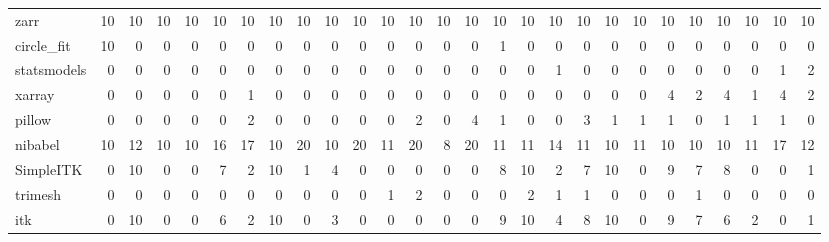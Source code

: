 \begin{tabular}{lrrrrrrrrrrrrrrrrrrrrrrrrrr}
zarr & 10 & 10 & 10 & 10 & 10 & 10 & 10 & 10 & 10 & 10 & 10 & 10 & 10 & 10 & 10 & 10 & 10 & 10 & 10 & 10 & 10 & 10 & 10 & 10 & 10 & 10 \\
circle\_fit & 10 & 0 & 0 & 0 & 0 & 0 & 0 & 0 & 0 & 0 & 0 & 0 & 0 & 0 & 1 & 0 & 0 & 0 & 0 & 0 & 0 & 0 & 0 & 0 & 0 & 0 \\
statsmodels & 0 & 0 & 0 & 0 & 0 & 0 & 0 & 0 & 0 & 0 & 0 & 0 & 0 & 0 & 0 & 0 & 1 & 0 & 0 & 0 & 0 & 0 & 0 & 0 & 1 & 2 \\
xarray & 0 & 0 & 0 & 0 & 0 & 1 & 0 & 0 & 0 & 0 & 0 & 0 & 0 & 0 & 0 & 0 & 0 & 0 & 0 & 0 & 4 & 2 & 4 & 1 & 4 & 2 \\
pillow & 0 & 0 & 0 & 0 & 0 & 2 & 0 & 0 & 0 & 0 & 0 & 2 & 0 & 4 & 1 & 0 & 0 & 3 & 1 & 1 & 1 & 0 & 1 & 1 & 1 & 0 \\
nibabel & 10 & 12 & 10 & 10 & 16 & 17 & 10 & 20 & 10 & 20 & 11 & 20 & 8 & 20 & 11 & 11 & 14 & 11 & 10 & 11 & 10 & 10 & 10 & 11 & 17 & 12 \\
SimpleITK & 0 & 10 & 0 & 0 & 7 & 2 & 10 & 1 & 4 & 0 & 0 & 0 & 0 & 0 & 8 & 10 & 2 & 7 & 10 & 0 & 9 & 7 & 8 & 0 & 0 & 1 \\
trimesh & 0 & 0 & 0 & 0 & 0 & 0 & 0 & 0 & 0 & 0 & 1 & 2 & 0 & 0 & 0 & 2 & 1 & 1 & 0 & 0 & 0 & 1 & 0 & 0 & 0 & 0 \\
itk & 0 & 10 & 0 & 0 & 6 & 2 & 10 & 0 & 3 & 0 & 0 & 0 & 0 & 0 & 9 & 10 & 4 & 8 & 10 & 0 & 9 & 7 & 6 & 2 & 0 & 1 \\
\bottomrule
\end{tabular}
